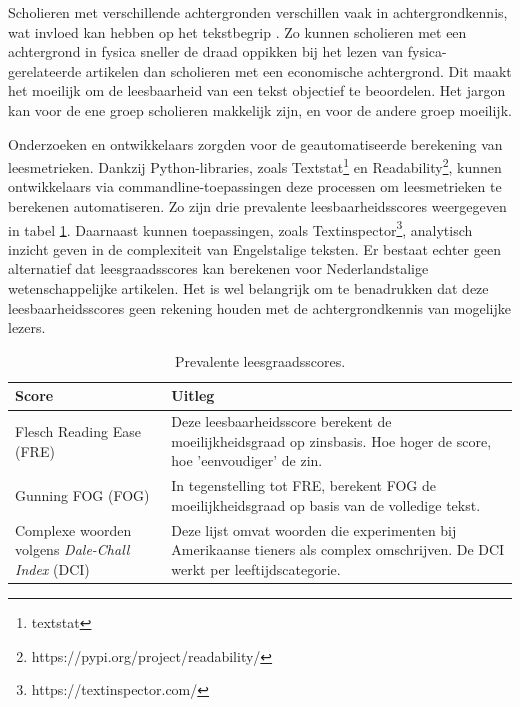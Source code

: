 Scholieren met verschillende achtergronden verschillen vaak in achtergrondkennis, wat invloed kan hebben op het tekstbegrip \autocite{DeMeyer2019}. Zo kunnen scholieren met een achtergrond in fysica sneller de draad oppikken bij het lezen van fysica-gerelateerde artikelen dan scholieren met een economische achtergrond. Dit maakt het moeilijk om de leesbaarheid van een tekst objectief te beoordelen. Het jargon kan voor de ene groep scholieren makkelijk zijn, en voor de andere groep moeilijk.

\medspace

Onderzoeken en ontwikkelaars zorgden voor de geautomatiseerde berekening van leesmetrieken. Dankzij Python-libraries, zoals Textstat\footnote{textstat} en Readability\footnote{https://pypi.org/project/readability/}, kunnen ontwikkelaars via commandline-toepassingen deze processen om leesmetrieken te berekenen automatiseren. Zo zijn drie prevalente leesbaarheidsscores weergegeven in tabel \ref{table:readability-scores}. Daarnaast kunnen toepassingen, zoals Textinspector\footnote{https://textinspector.com/}, analytisch inzicht geven in de complexiteit van Engelstalige teksten. Er bestaat echter geen alternatief dat leesgraadsscores kan berekenen voor Nederlandstalige wetenschappelijke artikelen. Het is wel belangrijk om te benadrukken dat deze leesbaarheidsscores geen rekening houden met de achtergrondkennis van mogelijke lezers.

\begin{center}
	\begin{table}[H]
	\begin{tabular}{ | m{5cm} | m{10cm} | } 
		\hline
		\textbf{Score} & \textbf{Uitleg} \\ 
		\hline
		Flesch Reading Ease (FRE) & Deze leesbaarheidsscore berekent de moeilijkheidsgraad op zinsbasis. Hoe hoger de score, hoe 'eenvoudiger' de zin. \\
		\hline
		Gunning FOG (FOG) & In tegenstelling tot FRE, berekent FOG de moeilijkheidsgraad op basis van de volledige tekst. \\
		\hline
		Complexe woorden volgens \textit{Dale-Chall Index} (DCI) & Deze lijst omvat woorden die experimenten bij Amerikaanse tieners als complex omschrijven. De DCI werkt per leeftijdscategorie. \\
		\hline
	\end{tabular}
	\caption{Prevalente leesgraadsscores.}
	\label{table:readability-scores}
	\end{table}
\end{center}

